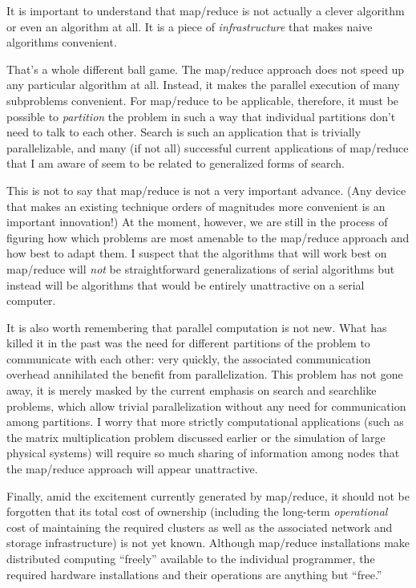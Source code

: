 It is important to understand that map/reduce is not actually a clever
algorithm or even an algorithm at all. It is a piece of
\emph{infrastructure} that makes naive algorithms convenient.

That's a whole different ball game. The map/reduce approach does not
speed up any particular algorithm at all. Instead, it makes the
parallel execution of many subproblems convenient. For map/reduce to
be applicable, therefore, it must be possible to \emph{partition} the
problem in such a way that individual partitions don't need to talk to
each other. Search is such an application that is trivially
parallelizable, and many (if not all) successful current applications
of map/reduce that I am aware of seem to be related to generalized forms
of search.

This is not to say that map/reduce is not a very important advance.
(Any device that makes an existing technique orders of magnitudes more
convenient is an important innovation!) At the moment, however, we are
still in the process of figuring how which problems are most amenable
to the map/reduce approach and how best to adapt them.  I suspect that
the algorithms that will work best on map/reduce will \emph{not} be
straightforward generalizations of serial algorithms but instead will
be algorithms that would be entirely unattractive on a serial
computer.

It is also worth remembering that parallel computation is not new.
What has killed it in the past was the need for different partitions
of the problem to communicate with each other: very quickly, the
associated communication overhead annihilated the benefit from
parallelization. This problem has not gone away, it is merely masked
by the current emphasis on search and searchlike problems, which allow
trivial parallelization without any need for communication among
partitions. I worry that more strictly computational applications
(such as the matrix multiplication problem discussed earlier or the
simulation of large physical systems) will require so much sharing of
information among nodes that the map/reduce approach will appear
unattractive.

Finally, amid the excitement currently generated by map/reduce, it
should not be forgotten that its total cost of ownership (including
the long-term \emph{operational} cost of maintaining the required
clusters as well as the associated network and storage infrastructure)
is not yet known.\vadjust{\pagebreak}  Although map/reduce installations make distributed
computing ``freely'' available to the individual programmer, the
required hardware installations and their operations are anything but
``free.''


